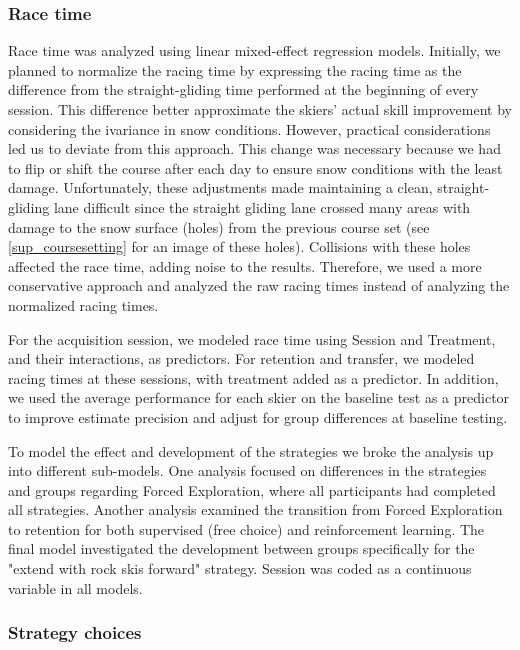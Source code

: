 \documentclass[pdflatex,sn-mathphys-num]{sn-jnl}%
\theoremstyle{thmstyleone}%
\theoremstyle{thmstyletwo}%
\theoremstyle{thmstylethree}%
\begin{document}
 \subsubsection{Race time}

Race time was analyzed using linear mixed-effect regression models. Initially, we planned to normalize the racing time by expressing the racing time as the difference from the straight-gliding time performed at the beginning of every session. This difference better approximate the skiers' actual skill improvement by considering the ivariance in snow conditions. However, practical considerations led us to deviate from this approach. This change was necessary because we had to flip or shift the course after each day to ensure snow conditions with the least damage. Unfortunately, these adjustments made maintaining a clean, straight-gliding lane difficult since the straight gliding lane crossed many areas with damage to the snow surface (holes) from the previous course set (see \ref{sup_coursesetting} for an image of these holes). Collisions with these holes affected the race time, adding noise to the results. Therefore, we used a more conservative approach and analyzed the raw racing times instead of analyzing the normalized racing times.

For the acquisition session, we modeled race time using Session and Treatment, and their interactions, as predictors. For retention and transfer, we modeled racing times at these sessions, with treatment added as a predictor. In addition, we used the average performance for each skier on the baseline test as a predictor to improve estimate precision and adjust for group differences at baseline testing. 

To model the effect and development of the strategies we broke the analysis up into different sub-models. One analysis focused on differences in the strategies and groups regarding Forced Exploration, where all participants had completed all strategies. Another analysis examined the transition from Forced Exploration to retention for both supervised (free choice) and reinforcement learning. The final model investigated the development between groups specifically for the "extend with rock skis forward" strategy. Session was coded as a continuous variable in all models. 


\subsubsection{Strategy choices}
\end{document}
